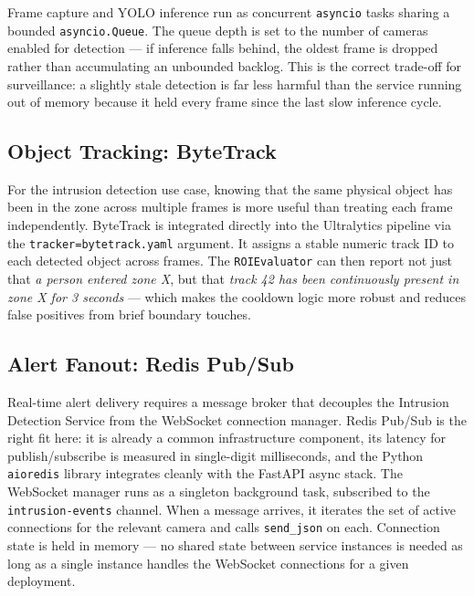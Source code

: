 \hspace{0.8cm}Frame capture and YOLO inference run as concurrent \texttt{asyncio} tasks sharing a bounded \texttt{asyncio.Queue}. The queue depth is set to the number of cameras enabled for detection --- if inference falls behind, the oldest frame is dropped rather than accumulating an unbounded backlog. This is the correct trade-off for surveillance: a slightly stale detection is far less harmful than the service running out of memory because it held every frame since the last slow inference cycle.

\subsection{Object Tracking: ByteTrack}
\label{subsec:s3_tracking}

\hspace{0.8cm}For the intrusion detection use case, knowing that the same physical object has been in the zone across multiple frames is more useful than treating each frame independently. ByteTrack is integrated directly into the Ultralytics pipeline via the \texttt{tracker=bytetrack.yaml} argument. It assigns a stable numeric track ID to each detected object across frames. The \texttt{ROIEvaluator} can then report not just that \emph{a person entered zone X}, but that \emph{track 42 has been continuously present in zone X for 3 seconds} --- which makes the cooldown logic more robust and reduces false positives from brief boundary touches.

\subsection{Alert Fanout: Redis Pub/Sub}
\label{subsec:s3_redis}

\hspace{0.8cm}Real-time alert delivery requires a message broker that decouples the Intrusion Detection Service from the WebSocket connection manager. Redis Pub/Sub is the right fit here: it is already a common infrastructure component, its latency for publish/subscribe is measured in single-digit milliseconds, and the Python \texttt{aioredis} library integrates cleanly with the FastAPI async stack. The WebSocket manager runs as a singleton background task, subscribed to the \texttt{intrusion-events} channel. When a message arrives, it iterates the set of active connections for the relevant camera and calls \texttt{send\_json} on each. Connection state is held in memory --- no shared state between service instances is needed as long as a single instance handles the WebSocket connections for a given deployment.


